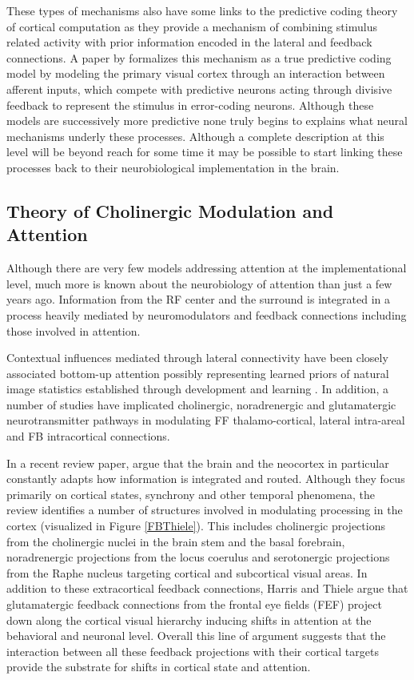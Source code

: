 These types of mechanisms also have some links to the predictive
coding theory of cortical computation as they provide a mechanism of
combining stimulus related activity with prior information encoded in
the lateral and feedback connections. A paper by \cite{Spratling2010}
formalizes this mechanism as a true predictive coding model by
modeling the primary visual cortex through an interaction between
afferent inputs, which compete with predictive neurons acting through
divisive feedback to represent the stimulus in error-coding
neurons. Although these models are successively more predictive none
truly begins to explains what neural mechanisms underly these
processes. Although a complete description at this level will be
beyond reach for some time it may be possible to start linking these
processes back to their neurobiological implementation in the brain.

\subsection{Theory of Cholinergic Modulation and Attention}

Although there are very few models addressing attention at the
implementational level, much more is known about the neurobiology of
attention than just a few years ago. Information from the RF center
and the surround is integrated in a process heavily mediated by
neuromodulators and feedback connections including those involved in
attention.

Contextual influences mediated through lateral connectivity have been
closely associated bottom-up attention possibly representing learned
priors of natural image statistics established through development and
learning \citep{Series2004}. In addition, a number of studies have
implicated cholinergic, noradrenergic and glutamatergic
neurotransmitter pathways in modulating FF thalamo-cortical, lateral
intra-areal and FB intracortical connections.

In a recent review paper, \cite{Harris2011} argue that the brain and
the neocortex in particular constantly adapts how information is
integrated and routed. Although they focus primarily on cortical
states, synchrony and other temporal phenomena, the review identifies
a number of structures involved in modulating processing in the cortex
(visualized in Figure \ref{FBThiele}). This includes cholinergic
projections from the cholinergic nuclei in the brain stem and the
basal forebrain, noradrenergic projections from the locus coerulus and
serotonergic projections from the Raphe nucleus targeting cortical and
subcortical visual areas. In addition to these extracortical feedback
connections, Harris and Thiele argue that glutamatergic feedback
connections from the frontal eye fields (FEF) project down along the
cortical visual hierarchy inducing shifts in attention at the
behavioral and neuronal level. Overall this line of argument suggests
that the interaction between all these feedback projections with their
cortical targets provide the substrate for shifts in cortical state
and attention.

